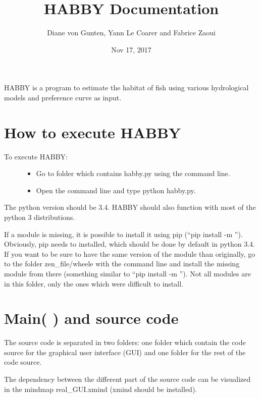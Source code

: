 \documentclass[letterpaper,10pt,english]{sphinxmanual}
\title{HABBY Documentation}
\date{Nov 17, 2017}
\author{Diane von Gunten, Yann Le Coarer and Fabrice Zaoui}
\begin{document}
\maketitle
\sphinxtableofcontents
{}\label{\detokenize{index::doc}}


HABBY is a program to estimate the habitat of fish using various hydrological models and preference curve as input.


\chapter{How to execute HABBY}
\label{\detokenize{index:how-to-execute-habby}}\label{\detokenize{index:welcome-to-habby-s-documentation}}\begin{description}
\item[{To execute HABBY:}] \leavevmode\begin{itemize}
\item {} 
Go to folder which contains habby.py using the command line.

\item {} 
Open the command line and type python habby.py.

\end{itemize}

\end{description}

The python version should be 3.4. HABBY should also function with most of the python 3 distributions.

If a module is missing, it is possible to install it using pip (``pip install -m ''). Obviously, pip needs to installed, which should be done by default in python 3.4. If you want to be sure to have the same version of the module than originally, go to the folder zen\_file/wheele with the command line and install the missing module from there (something similar to ``pip install -m ''). Not all modules are in this folder, only the ones which were difficult to install.


\chapter{Main(   ) and source code}
\label{\detokenize{index:main-and-source-code}}
The source code is separated in two folders: one folder which contain the code source for the graphical user interface (GUI) and one folder for the rest of the code source.

The dependency between the different part of the source code can be visualized in the mindmap real\_GUI.xmind (xmind should be installed).
\end{document}
